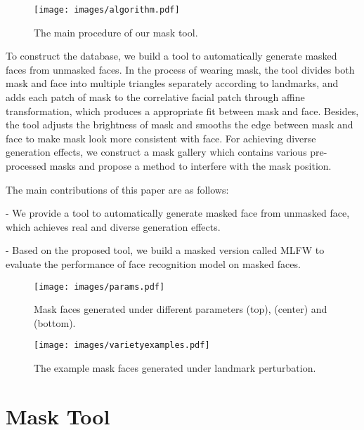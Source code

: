 \documentclass[final]{cvpr}
\begin{document}
\begin{figure*}[t]
	\begin{center}
		\texttt{[image: images/algorithm.pdf]}
	\end{center}
	\caption{
		The main procedure of our mask tool.
	}
\label{algorithmimg}
\end{figure*}


To construct the database, we build a tool to automatically generate masked faces from unmasked faces.
In the process of wearing mask, the tool divides both mask and face into multiple triangles separately according to landmarks, and adds each patch of mask to the correlative facial patch through affine transformation, which produces a appropriate fit between mask and face.
Besides, the tool adjusts the brightness of mask and smooths the edge between mask and face to make mask look more consistent with face.
For achieving diverse generation effects, we construct a mask gallery which contains various pre-processed masks and propose a method to interfere with the mask position.

The main contributions of this paper are as follows:

- We provide a tool to automatically generate masked face from unmasked face, which achieves real and diverse generation effects.

- Based on the proposed tool, we build a masked version called MLFW to evaluate the performance of face recognition model on masked faces.

\begin{figure*}[t]
	\begin{center}
		\texttt{[image: images/params.pdf]}
	\end{center}
	\caption{
		Mask faces generated under different parameters  (top),  (center) and  (bottom).
	}
	\label{params}
\end{figure*}


\begin{figure}[t]
	\begin{center}
		\texttt{[image: images/varietyexamples.pdf]}
	\end{center}
	\caption{
		The example mask faces generated under landmark perturbation.
	}
	\label{varietyexamples}
\end{figure}

\section{Mask Tool}
\end{document}
